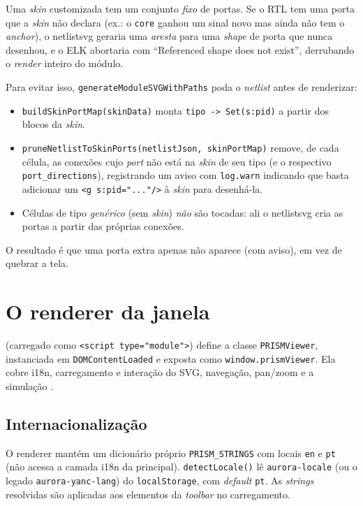 Uma \emph{skin} customizada tem um conjunto \emph{fixo} de portas. Se o RTL tem
uma porta que a \emph{skin} não declara (ex.: o \lstinline|core| ganhou um sinal
novo mas  ainda não tem o \emph{anchor}), o netlistsvg geraria uma
\emph{aresta} para uma \emph{shape} de porta que nunca desenhou, e o ELK abortaria
com \enquote{Referenced shape does not exist}, derrubando o \emph{render} inteiro
do módulo.

Para evitar isso, \lstinline|generateModuleSVGWithPaths| poda o \emph{netlist}
antes de renderizar:

\begin{itemize}[leftmargin=1.4em]
  \item \lstinline|buildSkinPortMap(skinData)| monta
        \lstinline|tipo -> Set(s:pid)| a partir dos blocos da \emph{skin}.
  \item \lstinline|pruneNetlistToSkinPorts(netlistJson, skinPortMap)| remove, de
        cada célula, as conexões cujo \emph{port} não está na \emph{skin} de seu
        tipo (e o respectivo \lstinline|port_directions|), registrando um aviso
        com \lstinline|log.warn| indicando que basta adicionar um
        \lstinline|<g s:pid="..."/>| à \emph{skin} para desenhá-la.
  \item Células de tipo \emph{genérico} (sem \emph{skin}) \emph{não} são tocadas:
        ali o netlistsvg cria as portas a partir das próprias conexões.
\end{itemize}

O resultado é que uma porta extra apenas não aparece (com aviso), em vez de
quebrar a tela.

\section{O renderer da janela}

 (carregado como \lstinline|<script type="module">|)
define a classe \lstinline|PRISMViewer|, instanciada em
\lstinline|DOMContentLoaded| e exposta como \lstinline|window.prismViewer|. Ela
cobre i18n, carregamento e interação do SVG, navegação, pan/zoom e a simulação
.

\subsection{Internacionalização}

O renderer mantém um dicionário próprio \lstinline|PRISM_STRINGS| com locais
\lstinline|en| e \lstinline|pt| (não acessa a camada i18n da 
principal). \lstinline|detectLocale()| lê \lstinline|aurora-locale| (ou o legado
\lstinline|aurora-yanc-lang|) do \lstinline|localStorage|, com \emph{default}
\lstinline|pt|. As \emph{strings} resolvidas são aplicadas aos elementos da
\emph{toolbar} no carregamento.

